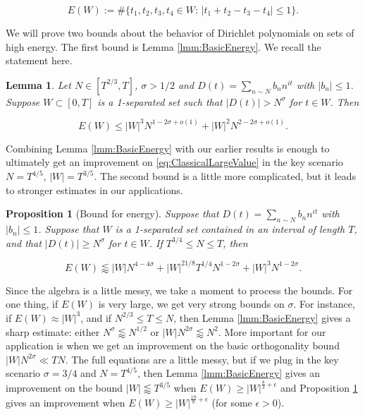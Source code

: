 \documentclass{amsart}
\theoremstyle{plain}
\newtheorem*{lmm*}{Lemma}
\newtheorem{prpstn}[thrm]{Proposition}
\numberwithin{equation}{section}
\begin{document}
\[
E(W) := \#\{t_1,t_2,t_3,t_4\in W:\,|t_1+t_2-t_3-t_4|\le 1\}.
\]

We will prove two bounds about the behavior of Dirichlet polynomials on sets of high energy.  The first bound is Lemma \ref{lmm:BasicEnergy}.  We recall the statement here.

\begin{lmm*}
Let $N\in [T^{2/3},T]$, $\sigma > 1/2$ and $D(t) = \sum_{n\sim N} b_n n^{i t }$ with $|b_n| \le 1$. Suppose $W \subset [0,T] $ is a 1-separated set such that $|D(t)| > N^\sigma$ for $t\in W$. Then

\[
E(W)\le |W|^3 N^{1-2\sigma+o(1)}+|W|^2 N^{2-2\sigma+o(1)}.
\]

\end{lmm*}

Combining Lemma \ref{lmm:BasicEnergy} with our earlier results is enough to ultimately get an improvement on \eqref{eq:ClassicalLargeValue} in the key scenario $N = T^{4/5}$, $|W| = T^{3/5}$.  
The second bound is a little more complicated, but it leads to stronger estimates in our applications.

%
%

\begin{prpstn}[Bound for energy] \label{prp:energybound} Suppose that $D(t) = \sum_{n \sim N} b_n n^{it}$ with $|b_n| \le 1$.   Suppose that $W$ is a 1-separated set contained in an interval of length $T$,  and that $|D(t)| \ge N^\sigma$ for $t \in W$.   If $T^{3/4} \le N \le T$,  then

\begin{equation}
E(W)\lessapprox |W| N^{4-4\sigma}+|W|^{21/8}T^{1/4}N^{1-2\sigma}+|W|^3N^{1-2\sigma}.
\label{eq:EnergyBound}
\end{equation}

\end{prpstn}

%
%

Since the algebra is a little messy,  we take a moment to process the bounds.   For one thing,  if $E(W)$ is very large,  we get very strong bounds on $\sigma$.   For instance,  if $E(W) \approx |W|^3$,  and if  $N^{2/3} \le T \le N$, then Lemma \ref{lmm:BasicEnergy} gives a sharp estimate: either $N^\sigma \lessapprox N^{1/2}$ or  $|W| N^{2 \sigma} \lessapprox N^2$.   More important for our application is when we get an improvement on the basic orthogonality bound $|W| N^{2 \sigma} \ll T N$.   The full equations are a little messy,  but if we plug in the key scenario $\sigma=3/4$ and $N= T^{4/5}$, then Lemma \ref{lmm:BasicEnergy} gives an improvement on the bound $|W| \lessapprox T^{3/5}$ when $E(W) \ge |W|^{\frac{8}{3} + \epsilon}$ and Proposition \ref{prp:energybound} gives an improvement when $E(W) \ge |W|^{\frac{19}{8}+\epsilon}$ (for some $\epsilon > 0$).  
\end{document}
